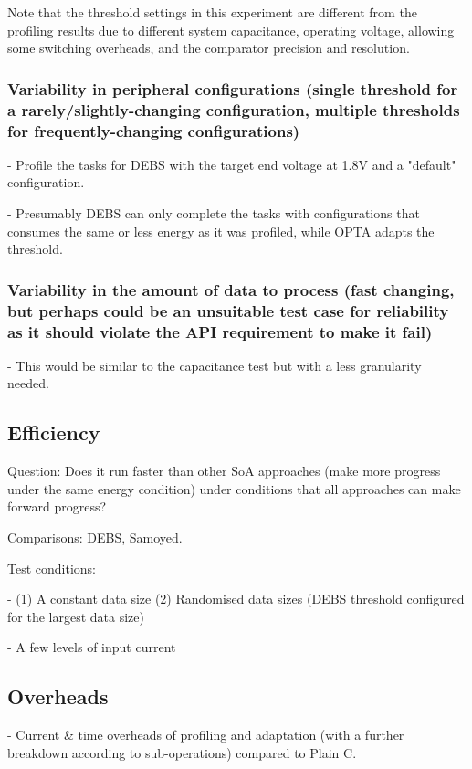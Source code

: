 Note that the threshold settings in this experiment are different from the profiling results due to different system capacitance, operating voltage, allowing some switching overheads, and the comparator precision and resolution. 

\subsubsection{Variability in peripheral configurations (single threshold for a rarely/slightly-changing configuration, multiple thresholds for frequently-changing configurations)}

- Profile the tasks for DEBS with the target end voltage at 1.8V and a "default" configuration. 
    
- Presumably DEBS can only complete the tasks with configurations that consumes the same or less energy as it was profiled, while OPTA adapts the threshold. 

\subsubsection{Variability in the amount of data to process (fast changing, but perhaps could be an unsuitable test case for reliability as it should violate the API requirement to make it fail)}
    
- This would be similar to the capacitance test but with a less granularity needed.

\subsection{Efficiency}

Question: Does it run faster than other SoA approaches (make more progress under the same energy condition) under conditions that all approaches can make forward progress?

Comparisons: DEBS, Samoyed.

Test conditions:
    
- (1) A constant data size (2) Randomised data sizes (DEBS threshold configured for the largest data size)

- A few levels of input current

\subsection{Overheads}

- Current \& time overheads of profiling and adaptation (with a further breakdown according to sub-operations) compared to Plain C. 

